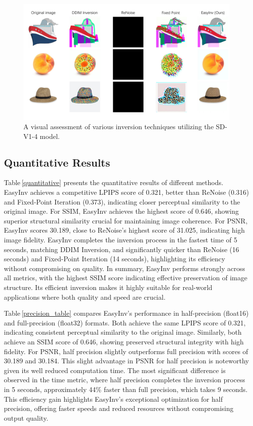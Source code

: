 \documentclass[letterpaper]{article} %
\begin{document}
%
\begin{figure}[!t]
    \centering
    \includegraphics[width=0.98\linewidth]{visual_SDV1-4.pdf}
    \caption{A visual assessment of various inversion techniques utilizing the SD-V1-4 model.}
    \label{SDV1-4_compare}
\end{figure}




\subsection{Quantitative Results}
\label{sec:quantitative}
%
Table\,\ref{quantitative} presents the quantitative results of different methods. EasyInv achieves a competitive LPIPS score of 0.321, better than ReNoise (0.316) and Fixed-Point Iteration (0.373), indicating closer perceptual similarity to the original image. For SSIM, EasyInv achieves the highest score of 0.646, showing superior structural similarity crucial for maintaining image coherence. For PSNR, EasyInv scores 30.189, close to ReNoise's highest score of 31.025, indicating high image fidelity. EasyInv completes the inversion process in the fastest time of 5 seconds, matching DDIM Inversion, and significantly quicker than ReNoise (16 seconds) and Fixed-Point Iteration (14 seconds), highlighting its efficiency without compromising on quality. In summary, EasyInv performs strongly across all metrics, with the highest SSIM score indicating effective preservation of image structure. Its efficient inversion makes it highly suitable for real-world applications where both quality and speed are crucial.


Table\,\ref{precision_table} compares EasyInv's performance in half-precision (float16) and full-precision (float32) formats. Both achieve the same LPIPS score of 0.321, indicating consistent perceptual similarity to the original image. Similarly, both achieve an SSIM score of 0.646, showing preserved structural integrity with high fidelity. For PSNR, half precision slightly outperforms full precision with scores of 30.189 and 30.184. This slight advantage in PSNR for half precision is noteworthy given its well reduced computation time. The most significant difference is observed in the time metric, where half precision completes the inversion process in 5 seconds, approximately 44\% faster than full precision, which takes 9 seconds. This efficiency gain highlights EasyInv's exceptional optimization for half precision, offering faster speeds and reduced resources without compromising output quality.
\end{document}
